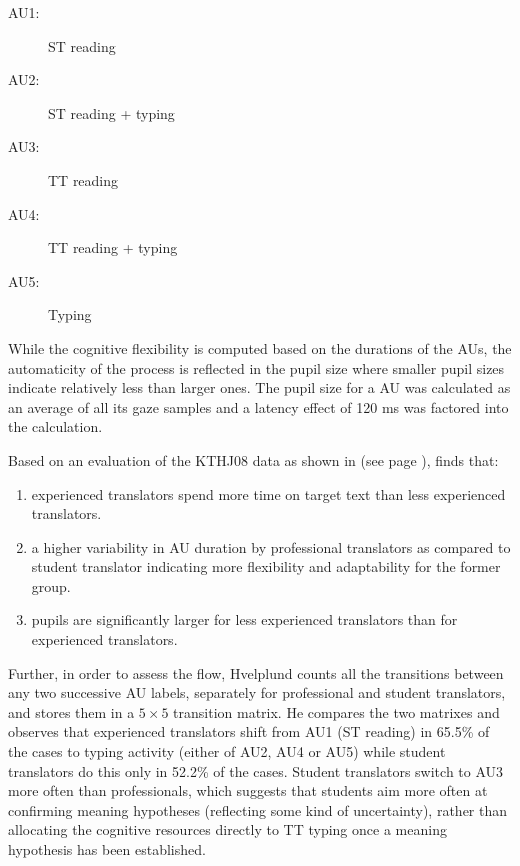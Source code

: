 \documentclass[output=paper]{LSP/langsci}
\begin{document}
\newpage 
\begin{description}
\item[AU1:] ST reading
\item[AU2:] ST reading + typing
\item[AU3:] TT reading
\item[AU4:] TT reading + typing
\item[AU5:] Typing
\end{description}

While the cognitive flexibility is computed based on the durations of the AUs, the automaticity of the process is reflected in the pupil size where smaller pupil sizes indicate relatively less  than larger ones. The pupil size for a AU was calculated as an average of all its gaze samples and a latency effect of 120 ms was factored into the calculation.

Based on an evaluation of the KTHJ08 data as shown in  (see page \pageref{carl-schaeffer:tab:tprmultilingdata}), \citet{Hvelplund2016} finds that:

\begin{enumerate}
\item experienced translators spend more time on target text than less experienced translators.
\item a higher variability in AU duration by professional translators as compared to student translator indicating more flexibility and adaptability for the former group.
\item pupils are significantly larger for less experienced translators than for experienced translators.
\end{enumerate}

Further, in order to assess the  flow, Hvelplund counts all the transitions between any two successive AU labels, separately for professional and student translators, and stores them in a  $5 \times 5$ transition matrix. He compares the two matrixes and observes that experienced translators shift from AU1 (ST reading) in 65.5\% of the cases to typing activity (either of AU2, AU4 or AU5) while student translators do this only in 52.2\% of the cases. Student translators switch to AU3 more often than professionals, which suggests that students aim more often at confirming meaning hypotheses (reflecting some kind of uncertainty), rather than allocating the cognitive resources directly to TT typing once a meaning hypothesis has been established.
\end{document}
